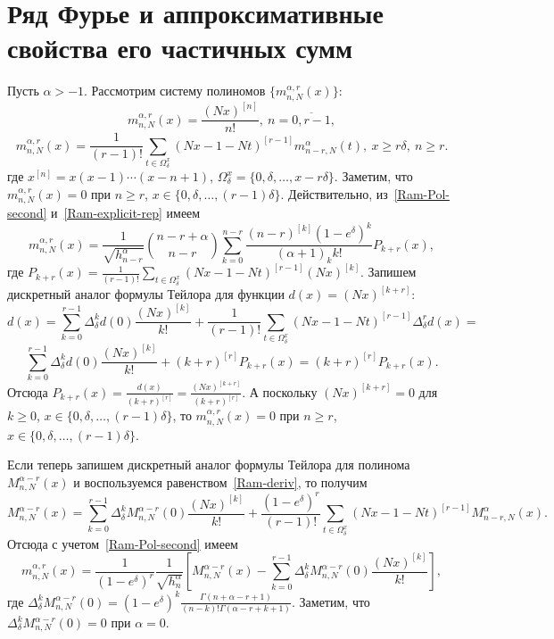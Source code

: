 \section{Ряд Фурье и аппроксимативные свойства его частичных сумм}

Пусть $\alpha>-1$. Рассмотрим систему полиномов $\{m_{n,N}^{\alpha,r}(x)\}$:
\begin{equation*}
m_{n,N}^{\alpha,r}(x)=\frac{(Nx)^{[n]}}{n!},\ n=\overline{0,r-1},
\end{equation*}
\begin{equation}\label{Ram-Pol-second}
m_{n,N}^{\alpha,r}(x)=
\frac{1}{(r-1)!}\sum\limits_{t\in \Omega_\delta^x}(Nx-1-Nt)^{[r-1]}m_{n-r,N}^\alpha(t),\ x\ge r\delta,\ n\ge r.
\end{equation}
где $x^{[n]}=x(x-1)\cdots(x-n+1)$, $\Omega_\delta^x=\{0, \delta, \ldots, x-r\delta\}$. Заметим, что $m_{n,N}^{\alpha,r}(x)=0$ при $n\ge r$, $x\in\{0, \delta, \ldots, (r-1)\delta\}$. Действительно, из~\eqref{Ram-Pol-second} и~\eqref{Ram-explicit-rep} имеем
$$
m_{n,N}^{\alpha,r}(x)=\frac{1}{\sqrt{h_{n-r}^\alpha}}
{\binom{n-r+\alpha}{n-r}}\sum_{k=0}^{n-r}{\frac{(n-r)^{[k]}\left(1-e^\delta\right)^k}{(\alpha+1)_kk!}}P_{k+r}(x),
$$
где $P_{k+r}(x)=\frac{1}{(r-1)!}\sum\limits_{t\in \Omega_\delta^x}(Nx-1-Nt)^{[r-1]}(Nx)^{[k]}$. Запишем дискретный аналог формулы Тейлора для функции $d(x)=(Nx)^{[k+r]}$:
$$
d(x)=\sum_{k=0}^{r-1}\Delta_\delta^kd(0)\frac{(Nx)^{[k]}}{k!}+\frac{1}{(r-1)!}\sum\limits_{t\in \Omega_\delta^x}(Nx-1-Nt)^{[r-1]}\Delta^r_\delta d(x)=
$$
$$
\sum_{k=0}^{r-1}\Delta_\delta^kd(0)\frac{(Nx)^{[k]}}{k!}+(k+r)^{[r]}P_{k+r}(x)=(k+r)^{[r]}P_{k+r}(x).
$$
Отсюда $P_{k+r}(x)=\frac{d(x)}{(k+r)^{[r]}}=\frac{(Nx)^{[k+r]}}{(k+r)^{[r]}}$. А поскольку $(Nx)^{[k+r]}=0$ для $k\ge0$, $x\in\{0, \delta, \ldots, (r-1)\delta\}$, то $m_{n,N}^{\alpha,r}(x)=0$ при $n\ge r$, $x\in\{0, \delta, \ldots, (r-1)\delta\}$.

Если теперь запишем дискретный аналог формулы Тейлора для полинома $M_{n,N}^{\alpha-r}(x)$ и воспользуемся равенством~\eqref{Ram-deriv}, то получим
$$
M_{n,N}^{\alpha-r}(x)=\sum_{k=0}^{r-1}\Delta_\delta^kM_{n,N}^{\alpha-r}(0)\frac{(Nx)^{[k]}}{k!}+
\frac{(1-e^\delta)^r}{(r-1)!}\sum\limits_{t\in \Omega_\delta^x}(Nx-1-Nt)^{[r-1]}M_{n-r,N}^{\alpha}(x).
$$
Отсюда с учетом~\eqref{Ram-Pol-second} имеем
\begin{equation}\label{Ram-rep-alpha-r}
m_{n,N}^{\alpha,r}(x)= \frac{1}{(1-e^\delta)^r}\frac{1}{\sqrt{h_{n}^{\alpha}}}\left[M_{n,N}^{\alpha-r}(x)-\sum_{k=0}^{r-1}\Delta_\delta^kM_{n,N}^{\alpha-r}(0)\frac{(Nx)^{[k]}}{k!}\right],
\end{equation}
где $\Delta^k_\delta M_{n,N}^{\alpha-r}(0)=(1-e^\delta)^k\frac{\Gamma(n+\alpha-r+1)}{(n-k)!\Gamma(\alpha-r+k+1)}$. Заметим, что $\Delta^k_\delta M_{n,N}^{\alpha-r}(0)=0$ при $\alpha=0$.

